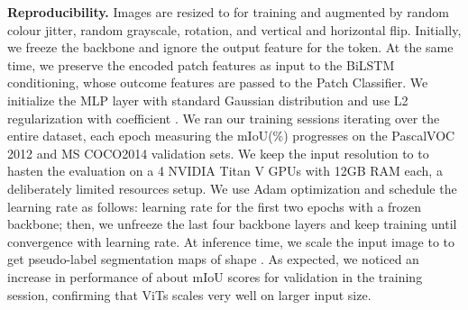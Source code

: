 \documentclass[runningheads]{styles/llncs}
\begin{document}
\noindent
{\bf Reproducibility.}
Images are resized to  for training and augmented by random colour jitter, random grayscale,   rotation, and vertical and horizontal flip. 
Initially, we freeze the backbone and ignore the output feature for the  token. At the same time, we preserve the  encoded patch features as input to the BiLSTM conditioning, whose outcome features are passed to the Patch Classifier. 
We initialize the MLP layer with standard Gaussian distribution and use L2 regularization with coefficient . 
We ran our training sessions iterating over the entire dataset, each epoch measuring the mIoU(\%) progresses on the PascalVOC 2012 and MS COCO2014 validation sets. We keep the input resolution to  to hasten the evaluation on a 4 NVIDIA
Titan V GPUs with 12GB RAM each, a deliberately limited resources setup. We use Adam optimization and schedule the learning rate as follows:   learning rate for the first two epochs with a frozen backbone; then, we unfreeze the last four backbone layers and keep training until convergence with  learning rate. At inference time, we scale the input image to  to get pseudo-label segmentation maps of shape . As expected, we noticed an increase in performance of about  mIoU scores for validation in the training session, confirming that ViTs scales very well on larger input size.
\end{document}

